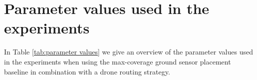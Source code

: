\documentclass{article}
\begin{document}
\section{Parameter values used in the experiments}
In Table \ref{tab:parameter values} we give an overview of the parameter values used in the experiments when using the max-coverage ground sensor placement baseline in combination with a drone routing strategy.
\begin{table}[H]
    \centering
{}
\caption{Parameter values used in the experiments.}
\label{tab:parameter values}
\end{table}
\end{document}
